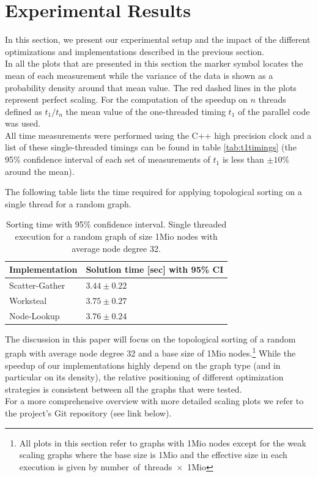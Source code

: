 \section{Experimental Results}\label{sec:exp}
%
In this section, we present our experimental setup and the impact of the different optimizations and implementations described in the previous section. \\
%
In all the plots that are presented in this section the marker symbol locates the mean of each measurement while the variance of the data is shown as a probability density around that mean value.
The red dashed lines in the plots represent perfect scaling.
For the computation of the speedup on $n$ threads defined as $t_1/t_n$ the mean value of the one-threaded timing $t_1$ of the parallel code was used. \\
All time measurements were performed using the C++ high precision clock and a list of these single-threaded timings can be found in table \ref{tab:t1timings} (the 95\% confidence interval of each set of measurements of $t_1$ is less than $\pm 10\%$ around the mean). \\
\par\medskip
The following table lists the time required for applying topological sorting on a single thread for a random graph.

  \begin{table}[h]
    \centering
    \begin{tabular}{ll}
		Implementation	& Solution time [sec] with 95\% CI \\
    \toprule
    Scatter-Gather		& $3.44 \pm 0.22$ \\
    Worksteal			& $3.75 \pm 0.27$ \\
    Node-Lookup			& $3.76 \pm 0.24$ \\
    \bottomrule
    \end{tabular}
    \caption{Sorting time with 95\% confidence interval. Single threaded execution for a random graph of size 1Mio nodes with average node degree 32.}
    \label{tab:abstimings}
  \end{table}
\par\medskip
The discussion in this paper will focus on the topological sorting of a random graph with average node degree 32 and a base size of 1Mio nodes.\footnote{All plots in this section refer to graphs with 1Mio nodes except for the weak scaling graphs where the base size is 1Mio and the effective size in each execution is given by number~of~threads~$\times$~1Mio} 
While the speedup of our implementations highly depend on the graph type (and in particular on its density), the relative positioning of different optimization strategies is consistent between all the graphs that were tested. \\
For a more comprehensive overview with more detailed scaling plots we refer to the project's Git repository (see link below).

